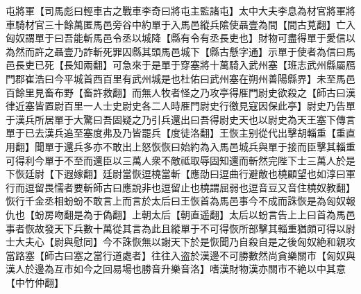屯將軍【司馬彪曰輕車古之戰車李奇曰將屯主監諸屯】太中大夫李息為材官將軍將車騎材官三十餘萬匿馬邑旁谷中約單于入馬邑縱兵隂使聶壹為間【間古莧翻】亡入匈奴謂單于曰吾能斬馬邑令丞以城降【縣有令有丞長吏也】財物可盡得單于愛信以為然而許之聶壹乃詐斬死罪囚縣其頭馬邑城下【縣古懸字通】示單于使者為信曰馬邑長吏已死【長知兩翻】可急來于是單于穿塞將十萬騎入武州塞【班志武州縣屬鴈門郡崔浩曰今平城首西百里有武州城是也杜佑曰武州塞在朔州善陽縣界】未至馬邑百餘里見畜布野【畜許救翻】而無人牧者怪之乃攻亭得㕍門尉史欲殺之【師古曰漢律近塞皆置尉百里一人士史尉史各二人時㕍門尉史行徼見寇因保此亭】尉史乃告單于漢兵所居單于大驚曰吾固疑之乃引兵還出曰吾得尉史天也以尉史為天王塞下傳言單于已去漢兵追至塞度弗及乃皆罷兵【度徒洛翻】王恢主别從代出擊胡輜重【重直用翻】聞單于還兵多亦不敢出上怒恢恢曰始約為入馬邑城兵與單于接而臣擊其輜重可得利今單于不至而還臣以三萬人衆不敵祗取辱固知還而斬然完陛下士三萬人於是下恢廷尉【下遐嫁翻】廷尉當恢逗橈當斬【應劭曰逗曲行避敵也橈顧望也如淳曰軍行而逗留畏懦者要斬師古曰應說非也逗留止也橈謂屈弱也逗音豆又音住橈奴教翻】恢行千金丞相蚡蚡不敢言上而言於太后曰王恢首為馬邑事今不成而誅恢是為匈奴報仇也【蚡房吻翻是為于偽翻】上朝太后【朝直遥翻】太后以蚡言告上上曰首為馬邑事者恢故發天下兵數十萬從其言為此且縱單于不可得恢所部擊其輜重猶頗可得以尉士大夫心【尉與慰同】今不誅恢無以謝天下於是恢聞乃自殺自是之後匈奴絶和親攻當路塞【師古曰塞之當行道處者】往往入盗於漢邊不可勝數然尚貪樂關市【匈奴與漢人於邊為互市如今之回易場也勝音升樂音洛】嗜漢財物漢亦關市不絶以中其意【中竹仲翻】

